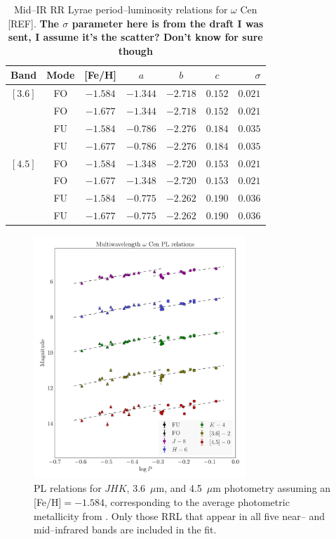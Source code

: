 \documentclass[a4paper,fleqn,usenatbib]{mnras}
\begin{document}
\begin{table}
\centering
\caption{Mid--IR RR Lyrae period--luminosity relations for $\omega$ Cen [REF]. {\bf The $\sigma$ parameter here is from the draft I was sent, I assume it's the scatter? Don't know for sure though }} 
\label{tab:pl_table}
\begin{tabular}{l|c|c|c|c|c|r} 
\hline \hline
Band & Mode  & [Fe/H]  & $a$   & $b$   & $c$   & $\sigma$ \\
\hline
$[3.6]$ & FO & $-1.584$ & $-1.344$ & $-2.718$ & $0.152$ & $0.021$ \\
            & FO & $-1.677$ & $-1.344$ & $-2.718$ & $0.152$ & $0.021$ \\
            & FU & $-1.584$ & $-0.786$ & $-2.276$ & $0.184$ & $0.035$ \\
            & FU & $-1.677$ & $-0.786$ & $-2.276$ & $0.184$ & $0.035$ \\
$[4.5]$ & FO & $-1.584$ & $-1.348$ & $-2.720$ & $0.153$ & $0.021$ \\         
            & FO & $-1.677$ & $-1.348$ & $-2.720$ & $0.153$ & $0.021$ \\         
            & FU & $-1.584$ & $-0.775$ & $-2.262$ & $0.190$ & $0.036$ \\
            & FU & $-1.677$ & $-0.775$ & $-2.262$ & $0.190$ & $0.036$ \\
            \hline
\end{tabular}
\end{table}


\begin{figure}
\begin{center}
\includegraphics[width=80mm]{final_plots/multiwavelength_PL_samestars_phot.pdf}
\caption{PL relations for $J\!H\!K$, 3.6~$\mu$m, and 4.5~$\mu$m photometry assuming an [Fe/H]$=-1.584$, corresponding to the average photometric metallicity from \citet{2000AJ....119.1824R}. Only those RRL that appear in all five near-- and mid--infrared bands are included in the fit.}
\label{fig:omegaCen_pl_phot}
\end{center}
\end{figure}
\end{document}

